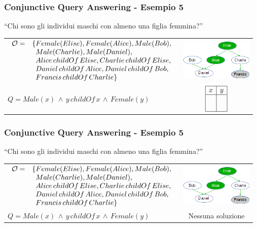 \documentclass[8pt]{beamer}
\begin{document}
\begin{frame}
\frametitle{Conjunctive Query Answering - Esempio 5}
\begin{center}
``Chi sono gli individui maschi con almeno una figlia femmina?''
\end{center}

\begin{tabular}{lc}
$\begin{array}{cl}
  \Ont  =  &  \{Female(Elise), Female(Alice), Male(Bob), \\
  &\phantom{\{}Male(Charlie), Male(Daniel), \\
  &\phantom{\{}Alice\,childOf\,Elise, Charlie\,childOf\,Elise, \\
  &\phantom{\{}Daniel\,childOf\,Alice, Daniel\,childOf\,Bob, \\
  &\phantom{\{}Francis\,childOf\,Charlie \}\\
\end{array}$ & \includegraphics[width=130px]{family.png} \\
$Q=Male(x)\,\wedge\,y\,childOf\,x\,\wedge\,Female(y)$ &
$\begin{array}{|c|c|}
  \hline
  x&y\\
  \hline
  &\\
  &\\
  \hline
\end{array}$\\
\end{tabular}
\end{frame}

\begin{frame}
\frametitle{Conjunctive Query Answering - Esempio 5}
\begin{center}
``Chi sono gli individui maschi con almeno una figlia femmina?''
\end{center}

\begin{tabular}{lc}
$\begin{array}{cl}
  \Ont  =  &  \{Female(Elise), Female(Alice), Male(Bob), \\
  &\phantom{\{}Male(Charlie), Male(Daniel), \\
  &\phantom{\{}Alice\,childOf\,Elise, Charlie\,childOf\,Elise, \\
  &\phantom{\{}Daniel\,childOf\,Alice, Daniel\,childOf\,Bob, \\
  &\phantom{\{}Francis\,childOf\,Charlie \}\\
\end{array}$ & \includegraphics[width=130px]{family.png} \\
$Q=Male(x)\,\wedge\,y\,childOf\,x\,\wedge\,Female(y)$ & Nessuna soluzione\\
\end{tabular}
\end{frame}
\end{document}
